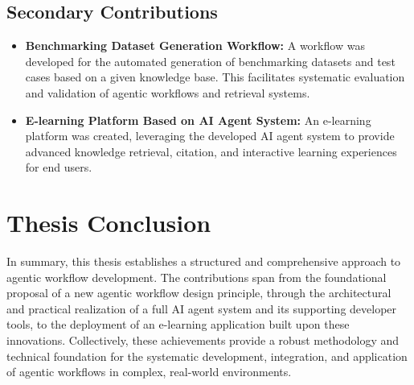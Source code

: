 \documentclass[../Main.tex]{subfiles}
\begin{document}
	\subsection{Secondary Contributions}
	\label{section:7.1.2_Secondary_contributions}
	\begin{itemize}
		\item \textbf{Benchmarking Dataset Generation Workflow:} A workflow was
			developed for the automated generation of benchmarking datasets and test
			cases based on a given knowledge base. This facilitates systematic evaluation
			and validation of agentic workflows and retrieval systems.

		\item \textbf{E-learning Platform Based on AI Agent System:} An e-learning
			platform was created, leveraging the developed AI agent system to provide advanced
			knowledge retrieval, citation, and interactive learning experiences for end
			users.
	\end{itemize}

	\section{Thesis Conclusion}
	\label{section:7.2_Thesis_conclusion}
	In summary, this thesis establishes a structured and comprehensive approach to
	agentic workflow development. The contributions span from the foundational
	proposal of a new agentic workflow design principle, through the architectural
	and practical realization of a full AI agent system and its supporting developer
	tools, to the deployment of an e-learning application built upon these
	innovations. Collectively, these achievements provide a robust methodology and
	technical foundation for the systematic development, integration, and
	application of agentic workflows in complex, real-world environments.
\end{document}
